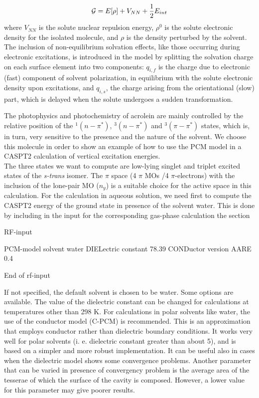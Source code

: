\begin{equation}
{\cal G} = E[\rho] + V_{NN} + \frac{1}{2} E_{int}
\end{equation}
where $V_{NN}$ is the solute nuclear repulsion energy, $\rho^0$ is the
solute electronic density for the isolated molecule, and $\rho$ is the
density perturbed by the solvent. \\
The inclusion of non-equilibrium solvation effects, like those
occurring during electronic excitations, is introduced in the model by
splitting the solvation charge on each surface element into
two components: $q_{i,f}$ is the charge due to electronic (fast) component
of solvent polarization, in equilibrium with the solute electronic density
upon excitations, and $q_{i,s}$, the charge arising from the orientational
(slow) part, which is delayed when the solute undergoes a sudden transformation.

The photophysics and photochemistry of 
acrolein are mainly controlled by the relative position of the 
$^1(n-\pi^*)$, $^3(n-\pi^*)$ and $^3(\pi-\pi^*)$ states, which is,
in turn, very sensitive to the presence and the nature of the solvent.
We choose this molecule in order to show an example of how to
use the PCM model in a CASPT2 calculation of vertical excitation
energies. \\

The three states we want to compute are low-lying singlet
and triplet excited states of the {\em s-trans} isomer. 
The $\pi$ space (4 $\pi$ MOs /4 $\pi$-electrons)
with the inclusion of the lone-pair MO ($n_y$) is a suitable choice 
for the active space in this calculation. 
For the calculation in aqueous solution, we need first to compute the CASPT2
energy of the ground state in presence of the solvent water.
This is done by including in the  input for the corresponding gas-phase
calculation the section

\begin{inputlisting}

RF-input

PCM-model
solvent
 water
DIELectric constant
 78.39
CONDuctor version
AARE
 0.4

End of rf-input

\end{inputlisting}

If not specified, the default solvent is chosen to be water. 
Some options are available. The value of the dielectric constant
can be changed for calculations at temperatures other than 298 K.
For calculations in polar solvents like water, the use of the conductor
model (C-PCM) is recommended.
This is an approximation that employs conductor rather than dielectric
boundary conditions. It works very well for polar solvents 
(i. e. dielectric constant greater than about 5), and is based  
on a simpler and more robust implementation. It can be useful also in cases when 
the dielectric model shows some convergence problems.
Another parameter that can be varied in presence of convergency problem
is the average area of the tesserae of which the surface of the cavity is composed.
However, a lower value for this parameter may give poorer results. \\

